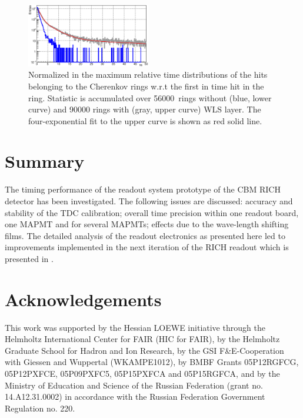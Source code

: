 \documentclass[final,5p,times,twocolumn]{elsarticle}
\begin{document}
\begin{figure}[tbh]
	\centering
	\includegraphics[width=0.48\textwidth]{figures/WLS_on_fitting_with_WLS_off_scaled.eps}
	\caption{Normalized in the maximum relative time distributions of the hits belonging to the Cherenkov rings w.r.t the first in time hit in the ring. Statistic is accumulated over 56000~rings without (blue, lower curve) and 90000 rings with (gray, upper curve) WLS layer. The four-exponential fit to the upper curve is shown as red solid line.}
	\label{fig:WLS}
\end{figure}

\section{Summary}

The timing performance of the readout system prototype of the CBM RICH detector has been investigated. The following issues are discussed: accuracy and stability of the TDC calibration; overall time precision within one readout board, one MAPMT and for several MAPMTs; effects due to the wave-length shifting films. The detailed analysis of the readout electronics as presented here led to improvements implemented in the next iteration of the RICH readout which is presented in \cite{PAULY}.

\section*{Acknowledgements}

This work was supported by the Hessian LOEWE initiative through the Helmholtz International Center for FAIR (HIC for FAIR), by the Helmholtz Graduate School for Hadron and Ion Research, by the GSI F\&E-Cooperation with Giessen and Wuppertal (WKAMPE1012), by BMBF Grants 05P12RGFCG, 05P12PXFCE, 05P09PXFC5, 05P15PXFCA and 05P15RGFCA, and by the Ministry of Education and Science of the Russian Federation (grant no. 14.A12.31.0002) in accordance with the Russian Federation Government Regulation no. 220.
\end{document}
